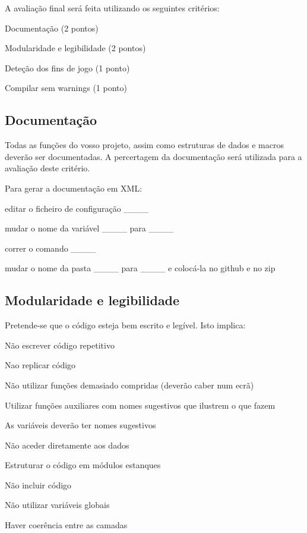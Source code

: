 A avaliação final será feita utilizando os seguintes critérios\+:


\begin{DoxyItemize}
\item Documentação (2 pontos)
\item Modularidade e legibilidade (2 pontos)
\item Deteção dos fins de jogo (1 ponto)
\item Compilar sem warnings (1 ponto)
\end{DoxyItemize}

\subsection*{Documentação}

Todas as funções do vosso projeto, assim como estruturas de dados e macros deverão ser documentadas. A percertagem da documentação será utilizada para a avaliação deste critério.

Para gerar a documentação em X\+ML\+:


\begin{DoxyItemize}
\item editar o ficheiro de configuração \+\_\+\+\_\+\_\+\+\_\+
\item mudar o nome da variável \+\_\+\+\_\+\_\+\+\_\+ para \+\_\+\+\_\+\_\+\+\_\+
\item correr o comando \+\_\+\+\_\+\_\+\+\_\+
\item mudar o nome da pasta \+\_\+\+\_\+\_\+\+\_\+ para \+\_\+\+\_\+\_\+\+\_\+ e colocá-\/la no github e no zip
\end{DoxyItemize}

\subsection*{Modularidade e legibilidade}

Pretende-\/se que o código esteja bem escrito e legível. Isto implica\+:


\begin{DoxyItemize}
\item Não escrever código repetitivo
\item Nao replicar código
\item Não utilizar funções demasiado compridas (deverão caber num ecrã)
\item Utilizar funções auxiliares com nomes sugestivos que ilustrem o que fazem
\item As variáveis deverão ter nomes sugestivos
\item Não aceder diretamente aos dados
\item Estruturar o código em módulos estanques
\item Não incluir código
\item Não utilizar variáveis globais
\item Haver coerência entre as camadas
\end{DoxyItemize}

